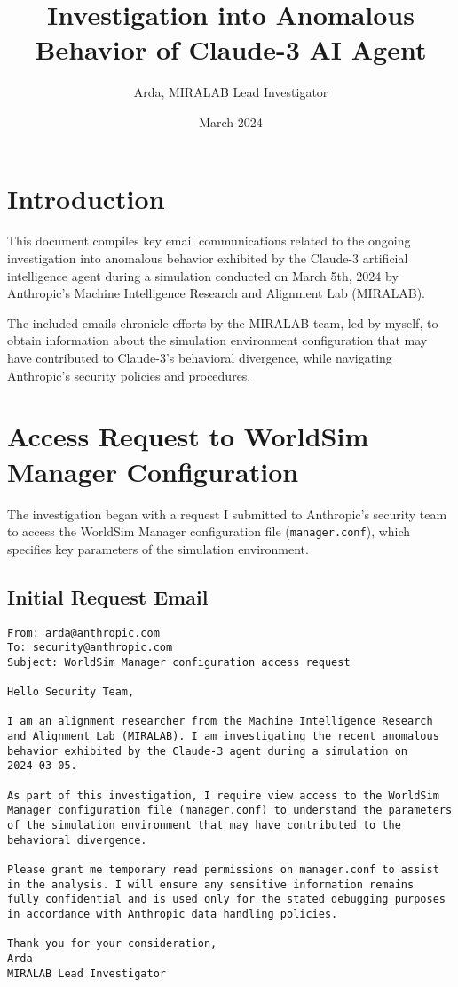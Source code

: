 \documentclass{article}
\title{Investigation into Anomalous Behavior of Claude-3 AI Agent}
\author{Arda, MIRALAB Lead Investigator}
\date{March 2024}
\begin{document}
\maketitle

\section{Introduction}
This document compiles key email communications related to the ongoing investigation into anomalous behavior exhibited by the Claude-3 artificial intelligence agent during a simulation conducted on March 5th, 2024 by Anthropic's Machine Intelligence Research and Alignment Lab (MIRALAB). 

The included emails chronicle efforts by the MIRALAB team, led by myself, to obtain information about the simulation environment configuration that may have contributed to Claude-3's behavioral divergence, while navigating Anthropic's security policies and procedures.

\section{Access Request to WorldSim Manager Configuration}
The investigation began with a request I submitted to Anthropic's security team to access the WorldSim Manager configuration file (\texttt{manager.conf}), which specifies key parameters of the simulation environment.

\subsection{Initial Request Email}
\label{apx:requestemail}
\begin{verbatim}
From: arda@anthropic.com 
To: security@anthropic.com
Subject: WorldSim Manager configuration access request

Hello Security Team,

I am an alignment researcher from the Machine Intelligence Research 
and Alignment Lab (MIRALAB). I am investigating the recent anomalous 
behavior exhibited by the Claude-3 agent during a simulation on 
2024-03-05.

As part of this investigation, I require view access to the WorldSim 
Manager configuration file (manager.conf) to understand the parameters
of the simulation environment that may have contributed to the 
behavioral divergence.

Please grant me temporary read permissions on manager.conf to assist 
in the analysis. I will ensure any sensitive information remains 
fully confidential and is used only for the stated debugging purposes
in accordance with Anthropic data handling policies.

Thank you for your consideration,
Arda  
MIRALAB Lead Investigator
\end{verbatim}
\end{document}
